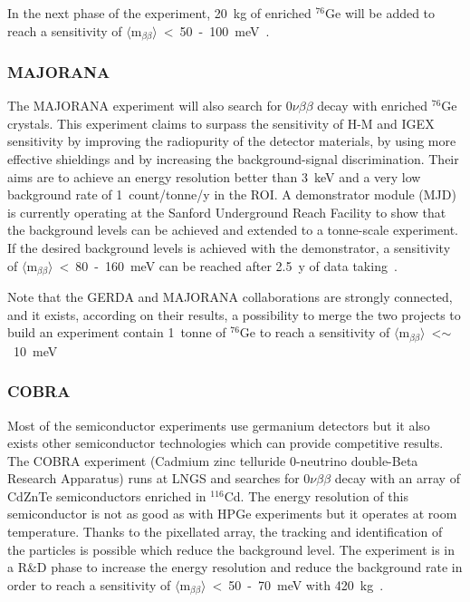 \documentclass[main.tex]{subfiles}
\begin{document}
\NI In the next phase of the experiment, 20~kg of enriched $^{\text{76}}$Ge will be added to reach a sensitivity of $\langle \text{m}_{\beta\beta} \rangle$~<~50~-~100~meV~\cite{GERDAprospective}.


\FloatBarrier


\subsubsection{MAJORANA}


The MAJORANA experiment will also search for 0$\nu\beta\beta$ decay with enriched $^{\text{76}}$Ge crystals. This experiment claims to surpass the sensitivity of H-M and IGEX sensitivity by improving the radiopurity of the detector materials, by using more effective shieldings and by increasing the background-signal discrimination. Their aims are to achieve an energy resolution better than 3~keV and a very low background rate of 1~count/tonne/y in the ROI. A demonstrator module (MJD) is currently operating at the Sanford Underground Reach Facility to show that the background levels can be achieved and extended to a tonne-scale experiment. If the desired background levels is achieved with the demonstrator, a sensitivity of $\langle \text{m}_{\beta\beta} \rangle$~<~80~-~160~meV can be reached after 2.5~y of data taking~\cite{MAJORANA}.


\bigskip


\NI Note that the GERDA and MAJORANA collaborations are strongly connected, and it exists, according on their results, a possibility to merge the two projects to build an experiment contain 1~tonne of $^{\text{76}}$Ge to reach a sensitivity of $\langle \text{m}_{\beta\beta} \rangle$~<$\sim$~10~meV~\cite{MAJORANAandGERDA} \\

\subsubsection{COBRA}


\NI Most of the semiconductor experiments use germanium detectors but it also exists other semiconductor technologies which can provide competitive results. The COBRA experiment (Cadmium zinc telluride 0-neutrino double-Beta Research Apparatus) runs at LNGS and searches for 0$\nu\beta\beta$ decay with an array of CdZnTe semiconductors enriched in $^{\text{116}}$Cd. The energy resolution of this semiconductor is not as good as with HPGe experiments but it operates at room temperature. Thanks to the pixellated array, the tracking and identification of the particles is possible which reduce the background level. The experiment is in a R\&D phase to increase the energy resolution and reduce the background rate in order to reach a sensitivity of $\langle \text{m}_{\beta\beta} \rangle$~<~50~-~70~meV with 420~kg~\cite{COBRA}.
\end{document}
